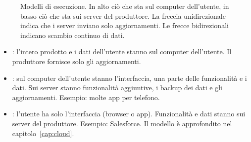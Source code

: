 \begin{figure}[ht]
\centering
{}
\caption{Modelli di esecuzione. In alto ciò che sta sul computer dell'utente, in basso ciò che sta sui server del
produttore. La freccia unidirezionale indica che i server inviano solo aggiornamenti. Le frecce bidirezionali
indicano scambio continuo di dati.}
\label{fig:prodotti-esecuzione}
\end{figure}

\begin{itemize}
  \item {}: l'intero prodotto e i dati dell'utente stanno sul computer dell'utente. Il produttore
    fornisce solo gli aggiornamenti.
  \item {}: sul computer dell'utente stanno l'interfaccia, una parte delle funzionalità e i dati.
    Sui server stanno funzionalità aggiuntive, i backup dei dati e gli aggiornamenti. Esempio: molte app per telefono.
  \item {}: l'utente ha solo l'interfaccia (browser o app). Funzionalità e dati stanno sui server del
    produttore. Esempio: Salesforce. Il modello è approfondito nel capitolo~\ref{cap:cloud}.
\end{itemize}

